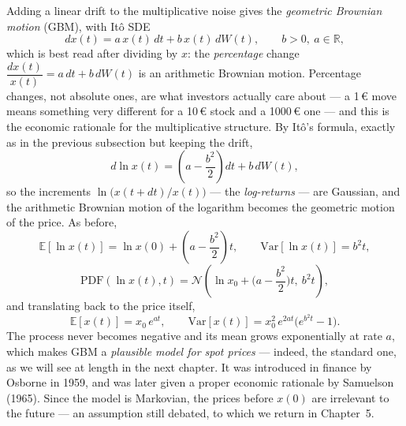 Adding a linear drift to the multiplicative noise gives the \emph{geometric Brownian motion} (GBM), with It\^o SDE
\begin{equation}
dx(t) = a\,x(t)\,dt + b\,x(t)\,dW(t),\qquad b>0,\ a\in\mathbb{R},
\end{equation}
which is best read after dividing by $x$: the \emph{percentage} change $\dfrac{dx(t)}{x(t)} = a\,dt + b\,dW(t)$ is an arithmetic Brownian motion.
Percentage changes, not absolute ones, are what investors actually care about --- a 1\,\euro{} move means something very different for a 10\,\euro{} stock and a 1000\,\euro{} one --- and this is the economic rationale for the multiplicative structure.
By It\^o's formula, exactly as in the previous subsection but keeping the drift,
\begin{equation}
d\ln x(t) = \left(a - \frac{b^2}{2}\right)dt + b\,dW(t),
\end{equation}
so the increments $\ln\!\big(x(t+dt)/x(t)\big)$ --- the \emph{log-returns} --- are Gaussian, and the arithmetic Brownian motion of the logarithm becomes the geometric motion of the price.
As before,
\begin{equation}
\mathbb{E}[\ln x(t)] = \ln x(0) + \left(a-\frac{b^2}{2}\right)t,\qquad \mathrm{Var}[\ln x(t)] = b^2 t,
\end{equation}
\begin{equation}
\mathrm{PDF}(\ln x(t),t) = \mathcal{N}\!\left(\ln x_0 + \Big(a-\frac{b^2}{2}\Big)t,\ b^2 t\right),
\end{equation}
and translating back to the price itself,
\begin{equation}
\mathbb{E}[x(t)] = x_0\,e^{at},\qquad \mathrm{Var}[x(t)] = x_0^2\,e^{2at}\big(e^{b^2 t}-1\big).
\end{equation}
The process never becomes negative and its mean grows exponentially at rate $a$, which makes GBM a \emph{plausible model for spot prices} --- indeed, the standard one, as we will see at length in the next chapter.
It was introduced in finance by Osborne in 1959\cite{Osborne1959}, and was later given a proper economic rationale by Samuelson (1965)\cite{Samuelson1965}.
Since the model is Markovian, the prices before $x(0)$ are irrelevant to the future --- an assumption still debated, to which we return in Chapter~5.

